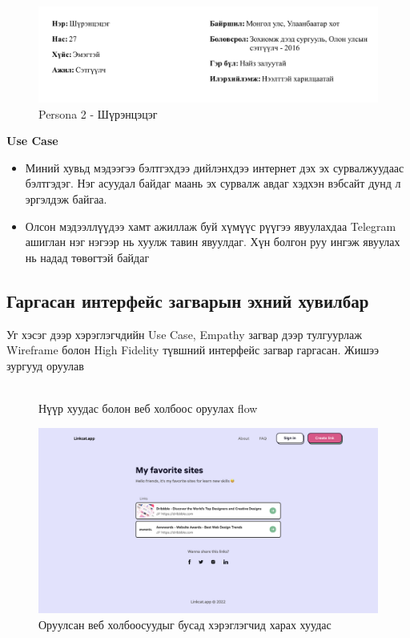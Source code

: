 \begin{figure}[h]
	\centering
	\includegraphics[width=15cm]{images/persona2-shurentsetseg.png}
	\caption{Persona 2 - Шүрэнцэцэг}
	\label{fig:persona1}
\end{figure}

\textbf{Use Case}

\begin{itemize}
	\item Миний хувьд мэдээгээ бэлтгэхдээ дийлэнхдээ интернет дэх эх сурвалжуудаас бэлтгэдэг. Нэг асуудал байдаг маань эх сурвалж авдаг хэдхэн вэбсайт дунд л эргэлдэж байгаа.
	\item Олсон мэдээллүүдээ хамт ажиллаж буй хүмүүс рүүгээ явуулахдаа Telegram ашиглан нэг нэгээр нь хуулж тавин явуулдаг. Хүн болгон руу ингэж явуулах нь надад төвөгтэй байдаг
\end{itemize}

\subsection{Гаргасан интерфейс загварын эхний хувилбар}

Уг хэсэг дээр хэрэглэгчдийн Use Case, Empathy загвар дээр тулгуурлаж Wireframe болон High Fidelity түвшний интерфейс загвар гаргасан. Жишээ зургууд оруулав

\begin{figure}[h]
	\centering
	\includegraphics[width=0.5]{images/01-interface.png}
	\caption{Нүүр хуудас болон веб холбоос оруулах flow}
	\label{fig:interface1}
\end{figure}

\begin{figure}[h]
	\centering
	\includegraphics[width=15cm]{images/03-interface-page.png}
	\caption{Оруулсан веб холбоосуудыг бусад хэрэглэгчид харах хуудас}
	\label{fig:interface1}
\end{figure}
